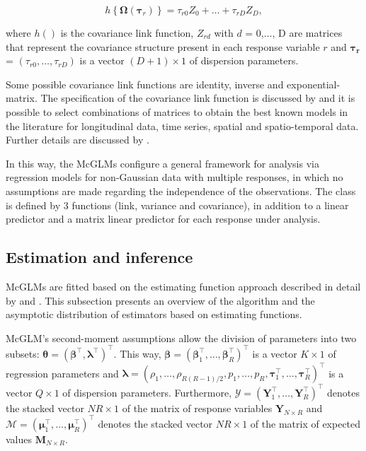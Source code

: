 \documentclass[article]{jss}\usepackage[]{graphicx}\usepackage[]{xcolor}
\begin{document}
$$
h\left \{ \boldsymbol{\Omega}(\boldsymbol{\tau}_r) \right \} = \tau_{r0}Z_0 + \ldots + \tau_{rD}Z_D,
$$

\noindent where $h()$ is the covariance link function, $Z_{rd}$ with $d$ = 0,$\ldots$, D are matrices that represent the covariance structure present in each response variable $r$ and $\boldsymbol{\tau_r}$ = $(\tau_{r0}, \ldots, \tau_{rD})$ is a vector $(D + 1) \times 1$ of dispersion parameters. 

Some possible covariance link functions are identity, inverse and exponential-matrix. The specification of the covariance link function is discussed by \citet{Pinheiro96} and it is possible to select combinations of matrices to obtain the best known models in the literature for longitudinal data, time series, spatial and spatio-temporal data. Further details are discussed by \citet{Demidenko13}.

In this way, the McGLMs configure a general framework for analysis via regression models for non-Gaussian data with multiple responses, in which no assumptions are made regarding the independence of the observations. The class is defined by 3 functions (link, variance and covariance), in addition to a linear predictor and a matrix linear predictor for each response under analysis. 

\subsection{Estimation and inference}\label{sec:inf}

McGLMs are fitted based on the estimating function approach described in detail by \citet{Bonat16} and \citet{jorg04}. This subsection presents an overview of the algorithm and the asymptotic distribution of estimators based on estimating functions.

McGLM's second-moment assumptions allow the division of parameters into two subsets: $\boldsymbol{\theta} = (\boldsymbol{\beta}^{\top}, \boldsymbol{\lambda}^{\top})^{\top}$. This way, $\boldsymbol{\beta} = (\boldsymbol{\beta}_1^\top, \ldots, \boldsymbol{\beta}_R^\top)^\top$ is a vector $K \times 1$ of regression parameters and $\boldsymbol{\lambda} = (\rho_1, \ldots, \rho_{R(R-1)/2}, p_1, \ldots, p_R, \boldsymbol{\tau}_1^\top, \ldots, \boldsymbol{\tau}_R^\top)^\top$ is a vector $Q \times 1$ of dispersion parameters. Furthermore, $\mathcal{Y} = (\boldsymbol{Y}_1^\top, \ldots, \boldsymbol{Y}_R^\top)^\top$ denotes the stacked vector $NR \times 1$ of the matrix of response variables $\boldsymbol{Y}_{N \times R}$ and $\mathcal{M} = (\boldsymbol{\mu}_1^\top, \ldots, \boldsymbol{\mu}_R^\top)^\top$ denotes the stacked vector $NR \times 1$ of the matrix of expected values $\boldsymbol{M}_{N \times R}$.
\end{document}
